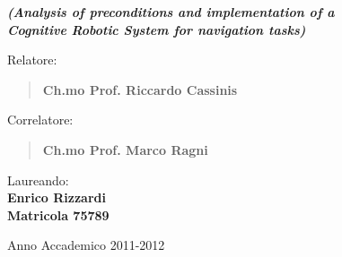 \begin{titlepage}
\begin{center}

\vspace{0.5cm}

{\small \emph{\textbf{(Analysis of preconditions and implementation of a \\ Cognitive Robotic System for navigation tasks)}}} \\

\vspace{1.5cm}

\begin{flushleft}

{\normalsize Relatore:}
\begin{quote}
{\large \textbf{Ch.mo Prof. Riccardo Cassinis}} \\
\vspace{0.2cm}
\end{quote}

{\normalsize Correlatore:}
\begin{quote}
{\large \textbf{Ch.mo Prof. Marco Ragni}} \\
\vspace{0.2cm}
\end{quote}

\end{flushleft}


\begin{flushright}
Laureando: \\
\textbf{Enrico Rizzardi} \\
\vspace{0.05cm}
\textbf{Matricola 75789} \\
\vspace{1.5cm}
\end{flushright}

\large{Anno Accademico 2011-2012}

\end{center}
\end{titlepage}